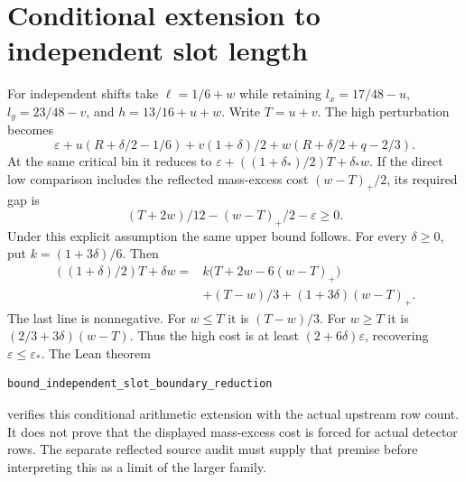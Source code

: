 \documentclass[11pt]{article}
\newcommand{\eps}{\varepsilon}
\begin{document}
\section{Conditional extension to independent slot length}

For independent shifts take $\ell=1/6+w$ while retaining
$l_x=17/48-u$, $l_y=23/48-v$, and $h=13/16+u+w$.
Write $T=u+v$. The high perturbation becomes
\[
 \eps+u(R+\delta/2-1/6)+v(1+\delta)/2
       +w(R+\delta/2+q-2/3).
\]
At the same critical bin it reduces to
$\eps+((1+\delta_*)/2)T+\delta_*w$.
If the direct low comparison includes the reflected mass-excess cost
$(w-T)_+/2$, its required gap is
\[
 (T+2w)/12-(w-T)_+/2-\eps\ge0.
\]
Under this explicit assumption the same upper bound follows. For every
$\delta\ge0$, put $k=(1+3\delta)/6$. Then
\begin{align*}
 ((1+\delta)/2)T+\delta w
 ={}&k\bigl(T+2w-6(w-T)_+\bigr)\\
 &+(T-w)/3+(1+3\delta)(w-T)_+.
\end{align*}
The last line is nonnegative. For $w\le T$ it is $(T-w)/3$.
For $w\ge T$ it is $(2/3+3\delta)(w-T)$.
Thus the high cost is at least $(2+6\delta)\eps$, recovering
$\eps\le\eps_*$. The Lean theorem
\begin{verbatim}
bound_independent_slot_boundary_reduction
\end{verbatim}
verifies this conditional arithmetic extension with the actual upstream row count.
It does not prove that the displayed mass-excess cost is forced for
actual detector rows. The separate reflected source audit must supply
that premise before interpreting this as a limit of the larger family.
\end{document}
